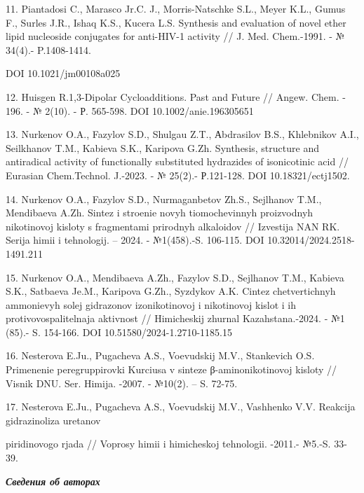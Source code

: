 \begin{noparindent}
11. Piantadosi C., Marasco Jr.C. J., Morris-Natschke S.L., Meyer K.L.,
Gumus F., Surles J.R., Ishaq K.S., Kucera L.S. Synthesis and evaluation
of novel ether lipid nucleoside conjugates for anti-HIV-1 activity // J.
Med. Chem.-1991. - № 34(4).- P.1408-1414.

DOI 10.1021/jm00108a025

12. Huisgen R.1,3-Dipolar Cycloadditions. Past and Future // Angew.
Chem. - 196. - № 2(10). - Р. 565-598. DOI 10.1002/anie.196305651

13. Nurkenov O.A., Fazylov S.D., Shulgau Z.T., Аbdrasilov B.S.,
Khlebnikov A.I., Seilkhanov T.M., Kabieva S.K., Karipova G.Zh.
Synthesis, structure and antiradical activity of functionally
substituted hydrazides of isonicotinic acid // Eurasian Chem.Technol.
J.-2023. - № 25(2).- Р.121-128. DOI 10.18321/ectj1502.

14. Nurkenov O.A., Fazylov S.D., Nurmaganbetov Zh.S., Sejlhanov T.M.,
Mendibaeva A.Zh. Sintez i stroenie novyh tiomochevinnyh proizvodnyh
nikotinovoj kisloty s fragmentami prirodnyh alkaloidov // Izvestija NAN
RK. Serija himii i tehnologij. -- 2024. - №1(458).-S. 106-115. DOI
10.32014/2024.2518-1491.211

15. Nurkenov O.A., Mendibaeva A.Zh., Fazylov S.D., Sejlhanov T.M.,
Kabieva S.K., Satbaeva Je.M., Karipova G.Zh., Syzdykov A.K. Cintez
chetvertichnyh ammonievyh solej gidrazonov izonikotinovoj i nikotinovoj
kislot i ih protivovospalitel\textquotesingle naja
aktivnost\textquotesingle{} // Himicheskij zhurnal Kazahstana.-2024. -
№1 (85).- S. 154-166. DOI 10.51580/2024-1.2710-1185.15

16. Nesterova E.Ju., Pugacheva A.S., Voevudskij M.V., Stankevich O.S.
Primenenie peregruppirovki Kurciusa v sinteze β-aminonikotinovoj kisloty
// Visnik DNU. Ser. Himija. -2007. - №10(2). -- S. 72-75.

17. Nesterova E.Ju., Pugacheva A.S., Voevudskij M.V., Vashhenko V.V.
Reakcija gidrazinoliza uretanov

piridinovogo rjada // Voprosy himii i
himicheskoj tehnologii. -2011.- №5.-S. 33-39.
\end{noparindent}

\emph{{\bfseries Сведения об авторах}}

